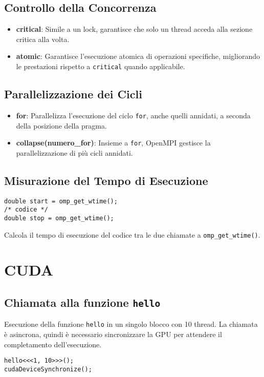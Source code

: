 \documentclass{article}
\begin{document}
\subsection{Controllo della Concorrenza}
\begin{itemize}
    \item \textbf{critical}: Simile a un lock, garantisce che solo un thread acceda alla sezione critica alla volta.
    \item \textbf{atomic}: Garantisce l'esecuzione atomica di operazioni specifiche, migliorando le prestazioni rispetto a \texttt{critical} quando applicabile.
\end{itemize}

\subsection{Parallelizzazione dei Cicli}
\begin{itemize}
    \item \textbf{for}: Parallelizza l'esecuzione del ciclo \texttt{for}, anche quelli annidati, a seconda della posizione della pragma.
    \item \textbf{collapse(numero\_for)}: Insieme a \texttt{for}, OpenMPI gestisce la parallelizzazione di più cicli annidati.
\end{itemize}

\subsection{Misurazione del Tempo di Esecuzione}
\begin{verbatim}
double start = omp_get_wtime();
/* codice */
double stop = omp_get_wtime();
\end{verbatim}

Calcola il tempo di esecuzione del codice tra le due chiamate a \texttt{omp\_get\_wtime()}.

\section{CUDA}

\subsection{Chiamata alla funzione \texttt{hello}}
Esecuzione della funzione \texttt{hello} in un singolo blocco con 10 thread. La chiamata è asincrona, quindi è necessario sincronizzare la GPU per attendere il completamento dell'esecuzione.
\begin{verbatim}
hello<<<1, 10>>>();
cudaDeviceSynchronize();
\end{verbatim}
\end{document}
